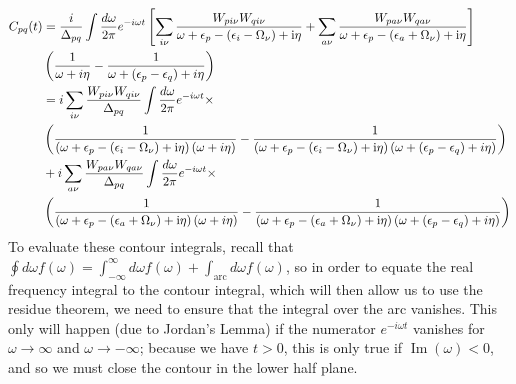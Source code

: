 \begin{align}
    C_{pq}(t) &= \frac{i}{\Delta_{pq}} \int \frac{d\omega}{2\pi} e^{-i\omega t} \left[ \sum_{i \nu} \frac{W_{p i \nu} W_{q i \nu}}{\omega+\epsilon_p-\left(\epsilon_i-\Omega_\nu\right)+\mathrm{i} \eta} + \sum_{a \nu}  \frac{W_{p a \nu} W_{q a \nu}}{\omega+\epsilon_p-\left(\epsilon_a+\Omega_\nu\right)+\mathrm{i} \eta} \right] \\
&\left(\frac{1}{\omega + i\eta} - \frac{1}{\omega + \left( \epsilon_p - \epsilon_q\right) + i \eta}\right) \notag \\ 
& = i \sum_{i \nu} \frac{W_{p i \nu} W_{q i \nu}}{\Delta_{pq}} \int \frac{d\omega}{2\pi} e^{-i\omega t} \times \\
&\left(\frac{1}{\left(\omega+\epsilon_p-\left(\epsilon_i-\Omega_\nu\right)+\mathrm{i} \eta\right)\left(\omega + i\eta\right)} - \frac{1}{\left(\omega+\epsilon_p-\left(\epsilon_i-\Omega_\nu\right)+\mathrm{i} \eta\right)\left(\omega + \left( \epsilon_p - \epsilon_q\right) + i\eta\right)}\right) \notag \\
& + i \sum_{a \nu} \frac{W_{p a \nu} W_{q a \nu}}{\Delta_{pq}} \int \frac{d\omega}{2\pi} e^{-i\omega t} \times \notag \\
&\left(\frac{1}{\left(\omega+\epsilon_p-\left(\epsilon_a+\Omega_\nu\right)+\mathrm{i} \eta\right)\left(\omega + i\eta\right)} - \frac{1}{\left(\omega+\epsilon_p-\left(\epsilon_a+\Omega_\nu\right)+\mathrm{i} \eta\right)\left(\omega + \left( \epsilon_p - \epsilon_q\right) + i\eta\right)}\right) \notag
\end{align}
To evaluate these contour integrals, recall that $\oint d\omega f(\omega) = \int_{-\infty}^{\infty} d\omega f(\omega) + \int_{\text{arc}} d\omega f(\omega)$, so in order to equate the real frequency integral to the contour integral, which will then allow us to use the residue theorem, we need to ensure that the integral over the arc vanishes. This only will happen (due to Jordan's Lemma) if the numerator $e^{-i\omega t}$ vanishes for $\omega \rightarrow \infty$ and $\omega \rightarrow -\infty$; because we have $t>0$, this is only true if $\operatorname{Im}(\omega) < 0$, and so we must close the contour in the lower half plane. 
